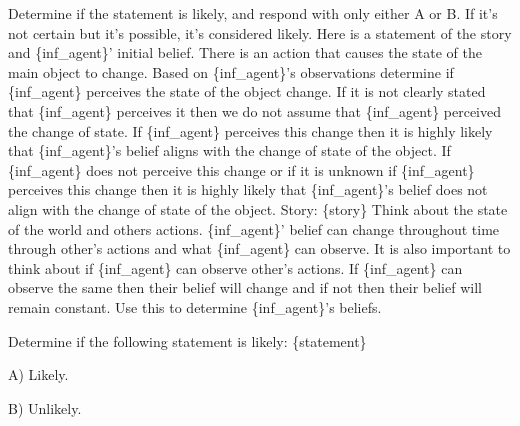 \begin{tcolorbox}[
    breakable,
    colframe=orange!40!black,
    colback=orange!10,
    coltitle=white,
    fonttitle=\bfseries,
    title=Estimating the likelihood of the initial belief,
    colbacktitle=orange!40!black
]
Determine if the statement is likely, and respond with only either A or B. If it's not certain but it's possible, it's considered likely.\newline
Here is a statement of the story and \{inf\_agent\}' initial belief. \newline
There is an action that causes the state of the main object to change. Based on \{inf\_agent\}'s observations determine if \{inf\_agent\} perceives the state of the object change. \newline
If it is not clearly stated that \{inf\_agent\} perceives it then we do not assume that \{inf\_agent\} perceived the change of state. \newline
If \{inf\_agent\} perceives this change then it is highly likely that \{inf\_agent\}'s belief aligns with the change of state of the object. \newline
If \{inf\_agent\} does not perceive this change or if it is unknown if \{inf\_agent\} perceives this change then it is highly likely that \{inf\_agent\}'s belief does not align with the change of state of the object. \newline
Story: \{story\} \newline
Think about the state of the world and others actions. \{inf\_agent\}' belief can change throughout time through other's actions and what \{inf\_agent\} can observe. It is also important to think about if \{inf\_agent\} can observe other's actions. If \{inf\_agent\} can observe the same then their belief will change and if not then their belief will remain constant. Use this to determine \{inf\_agent\}'s beliefs. \newline

Determine if the following statement is likely: \{statement\}

A) Likely.

B) Unlikely.
\end{tcolorbox}


